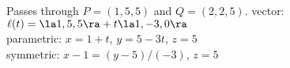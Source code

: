 {Passes through $P=(1,5,5)$ and $Q=(2,2,5)$.
}
{vector: $\ell(t) = \la1,5,5\ra + t\la 1,-3,0\ra$\\
parametric: $x= 1+t$, $y=5-3t$, $z=5$\\
symmetric: $x-1=(y-5)/(-3)$, $z=5$
}

